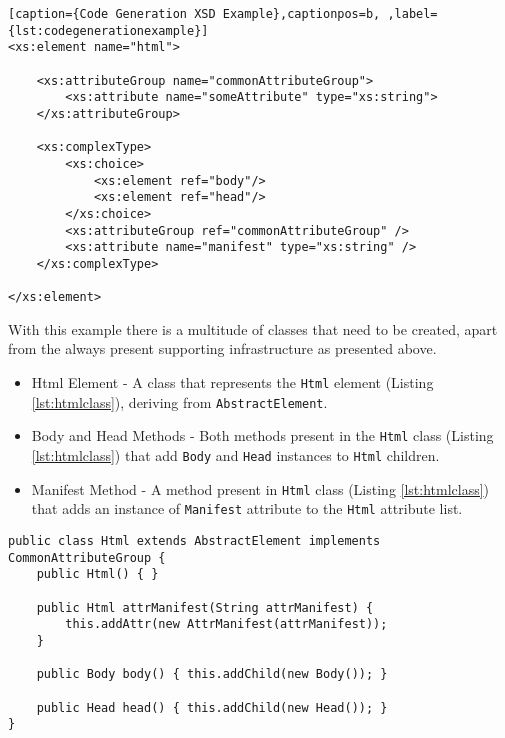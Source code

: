 \begin{minipage}{\linewidth}
\begin{lstlisting}[caption={Code Generation XSD Example},captionpos=b, ,label={lst:codegenerationexample}]
<xs:element name="html">
    
    <xs:attributeGroup name="commonAttributeGroup">
        <xs:attribute name="someAttribute" type="xs:string">
    </xs:attributeGroup>

    <xs:complexType>
        <xs:choice>
            <xs:element ref="body"/>
            <xs:element ref="head"/>
        </xs:choice>
        <xs:attributeGroup ref="commonAttributeGroup" />
        <xs:attribute name="manifest" type="xs:string" />
    </xs:complexType>
    
</xs:element>
\end{lstlisting}
\end{minipage}

\noindent
With this example there is a multitude of classes that need to be created, apart from the always present supporting infrastructure as presented above. 

\begin{itemize}
	\item Html Element - A class that represents the \texttt{Html} element (Listing \ref{lst:htmlclass}), deriving from \texttt{AbstractElement}.
	\item Body and Head Methods - Both methods present in the \texttt{Html} class (Listing \ref{lst:htmlclass}) that add \texttt{Body} and \texttt{Head} instances to \texttt{Html} children.
	\item Manifest Method - A method present in \texttt{Html} class (Listing \ref{lst:htmlclass}) that adds an instance of \texttt{Manifest} attribute to the \texttt{Html} attribute list.
\end{itemize}

\newpage


\begin{lstlisting}[caption={Html Element Class},captionpos=b,label={lst:htmlclass}]
public class Html extends AbstractElement implements CommonAttributeGroup {
    public Html() { }
    
    public Html attrManifest(String attrManifest) {
        this.addAttr(new AttrManifest(attrManifest));
    }
    
    public Body body() { this.addChild(new Body()); }
        
    public Head head() { this.addChild(new Head()); }
}
\end{lstlisting}

